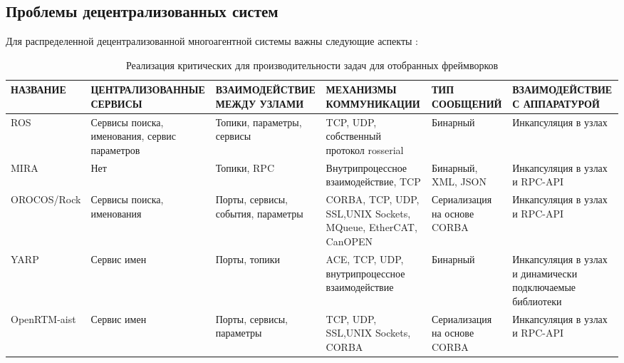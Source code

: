 \subsection{Проблемы децентрализованных систем}
Для распределенной децентрализованной многоагентной системы важны следующие аспекты \cite{c1}:

\begin{table*}[h!]
	\scriptsize
	\centering	
	\caption{Реализация критических для производительности задач для отобранных фреймворков}
	\label{tab:solutions}
	\def\arraystretch{1.5}
	\begin{tabular}{lp{3.5cm}p{3cm}p{3cm}p{1.9cm}p{2cm}}
		\toprule
		\textbf{НАЗВАНИЕ} & \textbf{ЦЕНТРАЛИЗОВАННЫЕ СЕРВИСЫ} & \textbf{ВЗАИМОДЕЙСТВИЕ МЕЖДУ УЗЛАМИ} & \textbf{МЕХАНИЗМЫ КОММУНИКАЦИИ} & \textbf{ТИП СООБЩЕНИЙ} & \textbf{ВЗАИМОДЕЙСТВИЕ С АППАРАТУРОЙ} \\		
		\midrule     
		ROS         & Сервисы поиска, именования, сервис параметров & Топики, параметры, сервисы         & TCP, UDP, собственный протокол rosserial                     & Бинарный                     & Инкапсуляция в узлах\\ 
		MIRA         & Нет                                           & Топики, RPC                        & Внутрипроцессное взаимодействие, TCP                         & Бинарный, XML, JSON  & Инкапсуляция в узлах и RPC-API     \\ 
		OROCOS/Rock  & Сервисы поиска, именования                    & Порты, сервисы, события, параметры & CORBA, TCP, UDP, SSL,UNIX Sockets, MQueue, EtherCAT, CanOPEN & Сериализация на основе CORBA & Инкапсуляция в узлах и RPC-API \\ 
		YARP         & Сервис имен                                   & Порты, топики                      & ACE, TCP, UDP, внутрипроцессное взаимодействие               & Бинарный                 & Инкапсуляция в узлах и динамически подключаемые библиотеки    \\ 
		OpenRTM-aist & Сервис имен                                   & Порты, сервисы, параметры          & TCP, UDP, SSL,UNIX Sockets, CORBA                            & Сериализация на основе CORBA & Инкапсуляция в узлах и RPC-API\\ 
		\bottomrule
	\end{tabular}
\end{table*}

